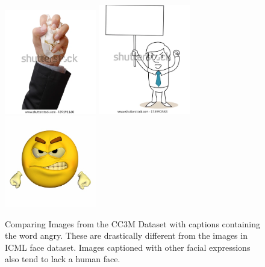 \documentclass{article} %
\theoremstyle{plain}
\theoremstyle{definition}
\theoremstyle{remark}
\begin{document}
\begin{figure}[!h]
    \centering\includegraphics[width=4cm]{../images/angry1.png} \hfill
    \includegraphics[width=4cm]{../images/angry2.png} \hfill
    \includegraphics[width=4cm]{../images/angry3.png}
    \caption{Comparing Images from the CC3M Dataset with captions containing the word angry. These are drastically different from the images in ICML face dataset. Images captioned with other facial expressions also tend to lack a human face.}
    \label{angry}
\end{figure}
\end{document}
